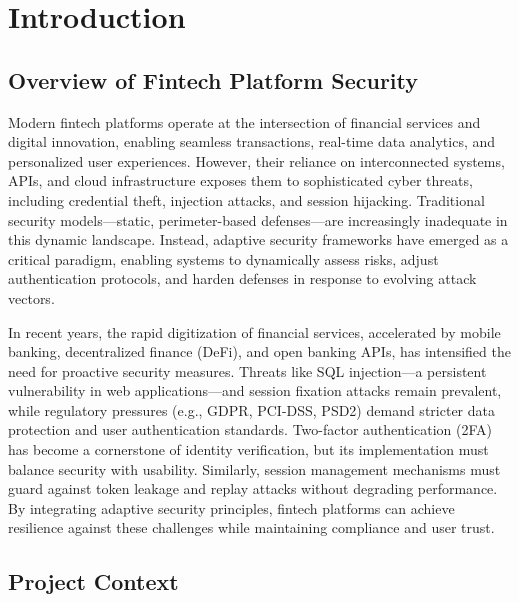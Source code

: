 \chapter{Introduction}

\section*{Overview of Fintech Platform Security}

Modern fintech platforms operate at the intersection of financial services and digital innovation, enabling seamless transactions, real-time data analytics, and personalized user experiences. However, their reliance on interconnected systems, APIs, and cloud infrastructure exposes them to sophisticated cyber threats, including credential theft, injection attacks, and session hijacking. Traditional security models—static, perimeter-based defenses—are increasingly inadequate in this dynamic landscape. Instead, adaptive security frameworks have emerged as a critical paradigm, enabling systems to dynamically assess risks, adjust authentication protocols, and harden defenses in response to evolving attack vectors.

In recent years, the rapid digitization of financial services, accelerated by mobile banking, decentralized finance (DeFi), and open banking APIs, has intensified the need for proactive security measures. Threats like SQL injection—a persistent vulnerability in web applications—and session fixation attacks remain prevalent, while regulatory pressures (e.g., GDPR, PCI-DSS, PSD2) demand stricter data protection and user authentication standards. Two-factor authentication (2FA) has become a cornerstone of identity verification, but its implementation must balance security with usability. Similarly, session management mechanisms must guard against token leakage and replay attacks without degrading performance. By integrating adaptive security principles, fintech platforms can achieve resilience against these challenges while maintaining compliance and user trust.

\section*{Project Context}

